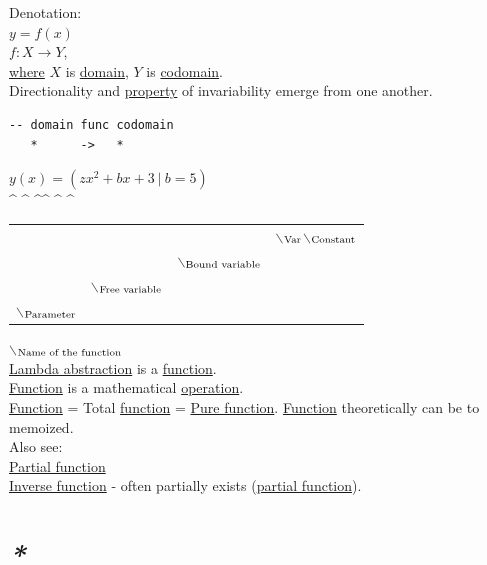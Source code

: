 \documentclass[a4paper,14pt,oneside]{book}
\begin{document}
Denotation:\\
\(y = f(x)\)\\
\(f: X \to Y\),\\
\hyperref[org12b3f26]{where} \(X\) is \hyperref[org0cadcd1]{domain}, \(Y\) is \hyperref[orgaa1c608]{codomain}.\\

Directionality and \hyperref[org49b84ac]{property} of invariability emerge from one another.\\
\begin{verbatim}
-- domain func codomain
   *      ->   *
\end{verbatim}

\(y(x) = (zx^{2} + bx + 3 \ | \ b = 5)\)\\
\^{} \^{}    \^{}\^{}    \^{}   \^{}\\
\begin{center}
\begin{tabular}{llll}
 &  &  & $\backslash$\(\textsubscript{Var}\)$\backslash$\(\textsubscript{Constant}\)\\
 &  & $\backslash$\(\textsubscript{Bound variable}\)\\
 & $\backslash$\(\textsubscript{Free variable}\)\\
$\backslash$\(\textsubscript{Parameter}\)\\
\end{tabular}
\end{center}
$\backslash$\(\textsubscript{Name of the function}\)\\

\hyperref[org8fcddd8]{Lambda abstraction} is a \hyperref[org9530a6b]{function}.\\
\hyperref[org9530a6b]{Function} is a mathematical \hyperref[orgbac7378]{operation}.\\

\hyperref[org9530a6b]{Function} = Total \hyperref[org9530a6b]{function} = \hyperref[org710f5cf]{Pure function}. \hyperref[org9530a6b]{Function} theoretically can be to memoized.\\

Also see:\\
\hyperref[org2b4a06a]{Partial function}\\
\hyperref[org36031bd]{Inverse function} - often partially exists (\hyperref[org2b4a06a]{partial function}).\\

\section{\emph{*}}
\label{sec:org8024c62}
\end{document}
